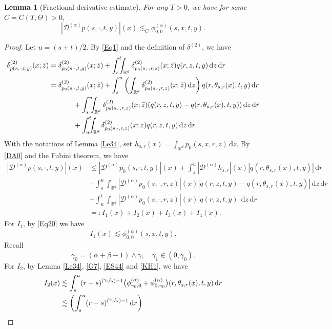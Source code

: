 \documentclass[JEP,XML,SOM,Unicode,published]{cedram}
\newcommand{\Psfrac}[2]{(\sfrac{#1}{#2})}
\theoremstyle{plain}
\newtheorem{lemma}[theorem]{Lemma}
\theoremstyle{definition}
\newcommand\cD{{\mathcal D}}
\newcommand\mR{\mathbb{R}}
\newcommand\1{{\mathbf{1}}}
\newcommand{\dif}{\,\mathrm{d}}
\begin{document}
\begin{lemma}[Fractional derivative estimate]\label{Le35}
For any $T>0$, we have for some $C=C(T,\Theta)>0$,
\[
|\cD^{(\alpha)}p(s,\cdot,t,y)|(x)\lesssim_C \phi^{(\alpha)}_{0,0}(s,x,t,y).
\]
\end{lemma}
\begin{proof}
Let $u=(s+t)/2$. By \eqref{Eq1} and the definition of $\delta^{(2)}$, we have
\begin{align*}
\delta^{(2)}_{p(s,\cdot,t,y)}(x;\bar z)&=
\delta^{(2)}_{p_0(s,\cdot,t,y)}(x;\bar z)+\int^t_{s}\!\!\!\int_{\mR^d}\delta^{(2)}_{p_0(s,\cdot,r,z)}(x;\bar z)q(r,z,t,y)\dif z\dif r\\
&=\delta^{(2)}_{p_0(s,\cdot,t,y)}(x;\bar z)+\int^u_{s}\left(\int_{\mR^d}\delta^{(2)}_{p_0(s,\cdot,r,z)}(x;\bar z)\dif z\right)q(r,\theta_{s,r}(x),t,y)\dif r\\
&\hspace*{1.2cm}+\int^u_{s}\!\!\!\int_{\mR^d}\delta^{(2)}_{p_0(s,\cdot,r,z)}(x;\bar z)(q(r,z,t,y)-q(r,\theta_{s,r}(x),t,y))\dif z\dif r\\
&\hspace*{1.2cm}+\int^t_u\!\!\!\int_{\mR^d}\delta^{(2)}_{p_0(s,\cdot,r,z)}(x;\bar z)q(r,z,t,y)\dif z\dif r.
\end{align*}
With the notations of Lemma \ref{Le34}, set
$h_{s,r}(x)=\int_{\mR^d}p_0(s,x,r,z)\dif z$. By \eqref{DA0} and the Fubini theorem, we have
\begin{align*}
|\cD^{(\alpha)} p(s,\cdot,t,y)|(x)
&\leq|\cD^{(\alpha)} p_0(s,\cdot,t,y)|(x)+\int^u_s |\cD^{(\alpha)}h_{s,r}|(x)|q(r,\theta_{s,r}(x),t,y)|\dif r
\\&+\int^u_s\!\!\!\int_{\mR^d}|\cD^{(\alpha) }p_0(s,\cdot,r,z)|(x)|q(r,z,t,y)-q(r,\theta_{s,r}(x),t,y)|\dif z\dif r
\\&+\int^t_u\!\!\!\int_{\mR^d}|\cD^{(\alpha) }p_0(s,\cdot,r,z)|(x)|q(r,z,t,y)|\dif z\dif r\\
&=:I_1(x)+I_2(x)+I_3(x)+I_4(x).
\end{align*}
For $I_1$, by \eqref{Eq20} we have
\[
I_1(x)\lesssim \phi^{(\alpha)}_{0,0}(s,x,t,y).
\]
Recall
\[
\gamma_0{=}(\alpha+\beta-1)\wedge\gamma,\quad \gamma_1\in(0,\gamma_0).
\]
For $I_2$, by Lemma \ref{Le34}, \eqref{G7}, \eqref{ES44} and \eqref{KH1}, we have
\begin{align*}
I_2(x)&\lesssim\int^u_s(r-s)^{\Psfrac{\gamma_0}{\alpha}-1}\bigl(\phi^{(\alpha)}_{\gamma_0,0}
+\phi^{(\alpha)}_{0,\gamma_0}\bigr)(r,\theta_{s,r}(x),t,y)\dif r
\\&\lesssim\biggl(\int^u_s(r-s)^{\Psfrac{\gamma_0}{\alpha}-1}\dif r\biggr)

\end{align*}
\end{proof}
\end{document}
